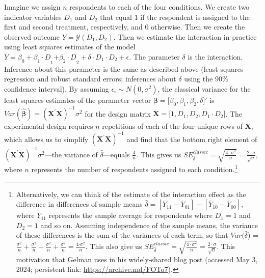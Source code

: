 \documentclass[12pt]{article}
\begin{document}
Imagine we assign $n$ respondents to each of the four conditions. 
We create two indicator variables $D_{1}$ and $D_{2}$ that equal 1 if the respondent is assigned to the first and second treatment, respectively, and 0 otherwise. 
Then we create the observed outcome $Y = \mathcal{Y}\left( D_{1},D_{2} \right)$. 
Then we estimate the interaction in practice using least squares estimates of the model
$Y = \beta_{0} + {\beta_{1} \cdot D}_{1}{{+ \beta}_{2} \cdot D}_{2} + \delta \cdot D_{1} \cdot D_{2} + \epsilon$.
The parameter $\delta$ is the interaction. 
Inference about this parameter is the same as described above (least squares regression and robust standard errors; inferences about $\delta$ using the 90\% confidence interval). 
By assuming $\epsilon_{i} \sim N\left( 0,\sigma^{2} \right)$, the classical variance for the least squares estimates of the parameter vector $\mathbf{\beta} = \lbrack\beta_{0},\beta_{1},\beta_{2},\delta\rbrack'$ is $Var\left( \widehat{\mathbf{\beta}} \right) = \left( \mathbf{X}^{'}\mathbf{X} \right)^{- 1}\sigma^{2}$ for the design matrix $\mathbf{X} = \lbrack 1,D_{1},D_{2},D_{1} \cdot D_{2}\rbrack$. 
The experimental design requires $n$ repetitions of each of the four unique rows of $\mathbf{X}$, which allows us to simplify $\left( \mathbf{X}^{'}\mathbf{X} \right)^{- 1}$ and find that the bottom right element of $\left( \mathbf{X}^{'}\mathbf{X} \right)^{- 1}\sigma^{2}$---the variance of $\widehat{\delta}$---equals $\frac{4}{n}$. 
This gives us $SE_{\widehat{\delta}}^{classic} = \sqrt{\frac{{4 \cdot \sigma}^{2}}{n}} = \frac{2 \cdot \sigma}{\sqrt{n}}$, where $n$ represents the number of respondents assigned to each condition.\footnote{Alternatively, we can think of the estimate of the
  interaction effect as the difference in differences of sample means
  $\widehat{\delta} = \left\lbrack {\overline{Y}}_{11}-{\overline{Y}}_{01} \right\rbrack - \left\lbrack {\overline{Y}}_{10}-{\overline{Y}}_{00} \right\rbrack$,
  where ${\overline{Y}}_{11}$ represents the sample average for respondents
  where $D_{1} = 1$ and $D_{2} = 1$ and so on. Assuming
  independence of the sample means, the variance of these differences is
  the sum of the variances of each term, so that
  $Var(\widehat{\delta}$) =
  $\frac{\sigma^{2}}{n} + \frac{\sigma^{2}}{n} + \frac{\sigma^{2}}{n} + \frac{\sigma^{2}}{n} = \frac{4{\cdot \sigma}^{2}}{n}$.
  This also give us
  $SE_{\widehat{\delta}}^{classic} = \sqrt{\frac{{4 \cdot \sigma}^{2}}{n}} = \frac{2 \cdot \sigma}{\sqrt{n}}$.
  This motivation that Gelman uses in his widely-shared blog post
  (accessed May 3, 2024; persistent link:
  \url{https://archive.md/FOTo7}).} 
\end{document}
